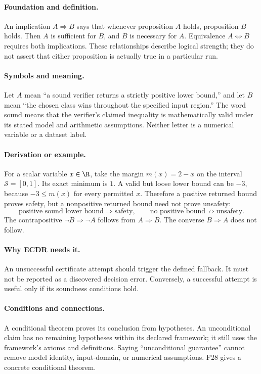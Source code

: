 \paragraph{Foundation and definition.}
An implication $A\Rightarrow B$ says that whenever proposition $A$ holds,
proposition $B$ holds. Then $A$ is sufficient for $B$, and $B$ is necessary
for $A$. Equivalence $A\Leftrightarrow B$ requires both implications.
These relationships describe logical strength; they do not assert that
either proposition is actually true in a particular run.
\paragraph{Symbols and meaning.}
Let $A$ mean ``a sound verifier returns a strictly positive lower bound,''
and let $B$ mean ``the chosen class wins throughout the specified input
region.'' The word sound means that the verifier's claimed inequality is
mathematically valid under its stated model and arithmetic assumptions.
Neither letter is a numerical variable or a dataset label.
\paragraph{Derivation or example.}
For a scalar variable $x\in\R$, take the margin $m(x)=2-x$ on the
interval $\mathcal S=[0,1]$. Its exact minimum is $1$. A valid but loose
lower bound can be $-3$, because $-3\le m(x)$ for every permitted $x$.
Therefore a positive returned bound proves safety, but a nonpositive
returned bound need not prove unsafety:
\[
 \text{positive sound lower bound}\Rightarrow\text{safety},
 \qquad
 \text{no positive bound}\not\Rightarrow\text{unsafety}.
\]
The contrapositive $\neg B\Rightarrow\neg A$ follows from
$A\Rightarrow B$. The converse $B\Rightarrow A$ does not follow.
\paragraph{Why ECDR needs it.}
An unsuccessful certificate attempt should trigger the defined fallback.
It must not be reported as a discovered decision error. Conversely, a
successful attempt is useful only if its soundness conditions hold.
\paragraph{Conditions and connections.}
A conditional theorem proves its conclusion from hypotheses. An
unconditional claim has no remaining hypotheses within its declared
framework; it still uses the framework's axioms and definitions. Saying
``unconditional guarantee'' cannot remove model identity, input-domain,
or numerical assumptions. F28 gives a concrete conditional theorem.

